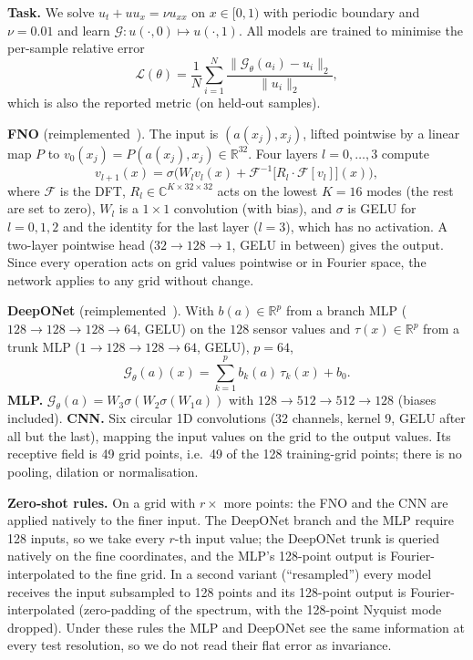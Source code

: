 \textbf{Task.} We solve $u_t+uu_x=\nu u_{xx}$ on $x\in[0,1)$ with periodic boundary and $\nu=0.01$ and learn $\mathcal G:u(\cdot,0)\mapsto u(\cdot,1)$. All models are trained to minimise the per-sample relative error
\begin{equation}
\mathcal L(\theta)=\frac1N\sum_{i=1}^N\frac{\lVert \mathcal G_\theta(a_i)-u_i\rVert_2}{\lVert u_i\rVert_2},
\end{equation}
which is also the reported metric (on held-out samples).

\textbf{FNO} (reimplemented~\cite{li2020fourier}). The input is $(a(x_j),x_j)$, lifted pointwise by a linear map $P$ to $v_0(x_j)=P(a(x_j),x_j)\in\mathbb R^{32}$. Four layers $l=0,\dots,3$ compute
\begin{equation}
v_{l+1}(x)=\sigma\!\big(W_lv_l(x)+\mathcal F^{-1}\!\big[R_l\cdot\mathcal F[v_l]\big](x)\big),
\end{equation}
where $\mathcal F$ is the DFT, $R_l\in\mathbb C^{K\times32\times32}$ acts on the lowest $K=16$ modes (the rest are set to zero), $W_l$ is a $1\times1$ convolution (with bias), and $\sigma$ is GELU for $l=0,1,2$ and the identity for the last layer ($l=3$), which has no activation. A two-layer pointwise head ($32\to128\to1$, GELU in between) gives the output. Since every operation acts on grid values pointwise or in Fourier space, the network applies to any grid without change.

\textbf{DeepONet} (reimplemented~\cite{lu2019deeponet}). With $b(a)\in\mathbb R^{p}$ from a branch MLP ($128\to128\to128\to64$, GELU) on the $128$ sensor values and $\tau(x)\in\mathbb R^p$ from a trunk MLP ($1\to128\to128\to64$, GELU), $p=64$,
\begin{equation}
\mathcal G_\theta(a)(x)=\sum_{k=1}^{p}b_k(a)\,\tau_k(x)+b_0 .
\end{equation}
\textbf{MLP.} $\mathcal G_\theta(a)=W_3\sigma(W_2\sigma(W_1a))$ with $128\to512\to512\to128$ (biases included). \textbf{CNN.} Six circular 1D convolutions (32 channels, kernel 9, GELU after all but the last), mapping the input values on the grid to the output values. Its receptive field is 49 grid points, i.e.\ 49 of the 128 training-grid points; there is no pooling, dilation or normalisation.

\textbf{Zero-shot rules.} On a grid with $r\times$ more points: the FNO and the CNN are applied natively to the finer input. The DeepONet branch and the MLP require 128 inputs, so we take every $r$-th input value; the DeepONet trunk is queried natively on the fine coordinates, and the MLP's 128-point output is Fourier-interpolated to the fine grid. In a second variant (``resampled'') every model receives the input subsampled to 128 points and its 128-point output is Fourier-interpolated (zero-padding of the spectrum, with the 128-point Nyquist mode dropped). Under these rules the MLP and DeepONet see the same information at every test resolution, so we do not read their flat error as invariance.

